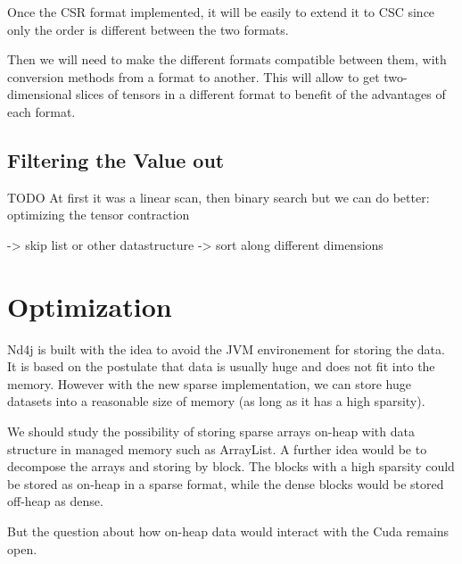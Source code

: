 Once the CSR format implemented, it will be easily to extend it to CSC since only the order is different between the two formats.

Then we will need to make the different formats compatible between them, with conversion methods from a format to another. This will allow to get two-dimensional slices of tensors in a different format to benefit of the advantages of each format.

\subsection{Filtering the Value out}
TODO %
At first it was a linear scan, then binary search but we can do better:
optimizing the tensor contraction

-> skip list or other datastructure 
-> sort along different dimensions



\section{Optimization}
Nd4j is built with the idea to avoid the JVM environement for storing the data. It is based on the postulate that data is usually huge and does not fit into the memory. However with the new sparse implementation, we can store huge datasets into a reasonable size of memory (as long as it has a high sparsity).

We should study the possibility of storing sparse arrays on-heap with data structure in managed memory such as ArrayList. A further idea would be to decompose the arrays and storing by block. The blocks with a high sparsity could be stored as on-heap in a sparse format, while the dense blocks would be stored off-heap as dense.

But the question about how on-heap data would interact with the Cuda remains open.